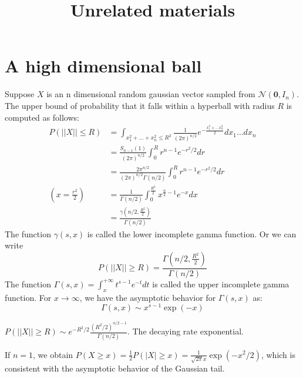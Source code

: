 \documentclass{article}
\title{Unrelated materials}
\begin{document}
\maketitle
\section{A high dimensional ball}
Suppose $X$ is an n dimensional random gaussian vector
sampled from
$\mathcal{N}(\bm{0}, I_n)$. The upper bound of probability that it
falls within a hyperball with radius $R$ is computed
as follows:
\begin{align*}
    P(||X||\leq R) &= \int_{x_1^2 + \dots + x_n^2 \leq R^2}
    \frac{1}{(2\pi)^{n/2}}
    e^{-\frac{x_1^2 + \dots x_n^2}{2}}
    dx_1 \dots dx_n\\
    &= \frac{S_{n-1}(1) }{(2\pi)^{n/2}}
    \int_0^R r^{n-1} e^{-r^2/2}dr
    \\
    &=\frac{2\pi^{n/2}}{(2\pi)^{n/2}\Gamma(n/2)}
    \int_0^R r^{n-1} e^{-r^2/2}dr \\
    (x=\frac{r^2}{2})
    &=\frac{1}{\Gamma(n/2)}
    \int_0^{\frac{R^2}{2}} x^{\frac{n}{2} - 1} e^{-x}dx\\
    &=\frac{\gamma(n/2, \frac{R^2}{2})}{\Gamma(n/2)}
\end{align*}
The function $\gamma(s,x)$
is called the lower
incomplete gamma function.
Or we can write
\begin{equation}
P(||X||\geq R)
= \frac{\Gamma(n/2, \frac{R^2}{2})}
{\Gamma(n/2)}
\end{equation}
The function
$\Gamma(s,x)=\int_x^{+\infty} t^{s-1} e^{-t} dt$
is called the upper incomplete
gamma function.
For $x\to \infty$,
we have the asymptotic behavior for $\Gamma(s,x)$
as:
\begin{equation}\label{eq:incomplete_upper_gamma}
    \Gamma(s,x) \sim x^{s-1} \exp(-x)
\end{equation}

$P(||X||\geq R) \sim e^{-R^2/2}\frac{(R^2/2)^{n/2-1}}{\Gamma(n/2)}$.
The decaying rate exponential.

If $n=1$, we obtain $P(X\geq x) = \frac{1}{2}P(|X|\geq x)
= \frac{1}{\sqrt{2\pi }x}\exp(-x^2/2)$, which is consistent with
the asymptotic behavior of the Gaussian tail.
\end{document}
